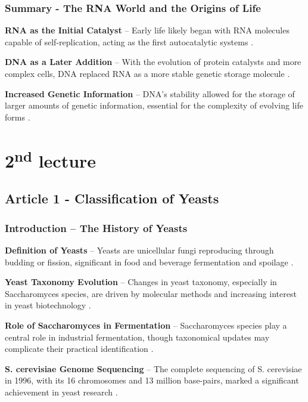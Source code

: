\subsubsection{Summary - The RNA World and the Origins of Life}

\textbf{RNA as the Initial Catalyst} – Early life likely began with RNA molecules capable of self-replication, acting as the first autocatalytic systems \cite*{L1-Chapter6}.

\textbf{DNA as a Later Addition} – With the evolution of protein catalysts and more complex cells, DNA replaced RNA as a more stable genetic storage molecule \cite*{L1-Chapter6}.

\textbf{Increased Genetic Information} – DNA’s stability allowed for the storage of larger amounts of genetic information, essential for the complexity of evolving life forms \cite*{L1-Chapter6}.

\section{2\texorpdfstring{\textsuperscript{nd}}{nd} lecture}

\subsection{Article 1 - Classification of Yeasts}
\subsubsection*{Introduction – The History of Yeasts}

\textbf{Definition of Yeasts} – Yeasts are unicellular fungi reproducing through budding or fission, significant in food and beverage fermentation and spoilage \cite*{L2-YeastClass}.

\textbf{Yeast Taxonomy Evolution} – Changes in yeast taxonomy, especially in Saccharomyces species, are driven by molecular methods and increasing interest in yeast biotechnology \cite*{L2-YeastClass}.

\textbf{Role of Saccharomyces in Fermentation} – Saccharomyces species play a central role in industrial fermentation, though taxonomical updates may complicate their practical identification \cite*{L2-YeastClass}.

\textbf{S. cerevisiae Genome Sequencing} – The complete sequencing of S. cerevisiae in 1996, with its 16 chromosomes and 13 million base-pairs, marked a significant achievement in yeast research \cite*{L2-YeastClass}.

